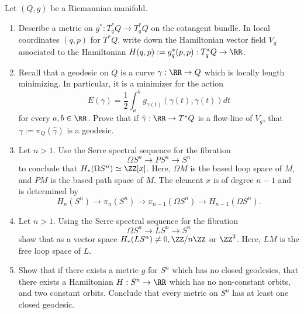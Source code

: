 
 
 \label{exr:geodesicsInSymplecticCohomology}
Let $(Q, g)$ be a Riemannian manifold. 
\begin{enumerate}
    \item Describe a metric on $ g^*:T^*_qQ\to T^*_qQ$ on the cotangent bundle. In local coordinates $(q, p)$ for $T^*Q$,  write down the Hamiltonian vector field $V_g$ associated to the Hamiltonian $H(q, p):=g_q^*(p, p): T^*_qQ\to \RR$.
    \item Recall that a geodesic on $Q$ is a curve $\gamma:\RR\to Q$ which is locally length minimizing. In particular, it is a minimizer for the action 
    \[E(\gamma)=\frac{1}{2}\int_a^b g_{\gamma(t)}(\dot \gamma(t), \dot \gamma(t)) dt\]
    for every $a,b\in \RR$. Prove that if $\hat \gamma: \RR\to T^*Q$ is a flow-line of $V_g$, that $\gamma:=\pi_Q(\hat \gamma)$ is a geodesic.
    \item Let $n>1$. Use the Serre spectral sequence for the fibration
    \[\Omega S^n\to PS^n\to S^n\]
    to conclude that $H_*(\Omega S^n)\simeq \ZZ[x]$. Here, $\Omega M$ is the based loop space of $M$, and $PM$ is the based path space of $M$. The element $x$ is of degree $n-1$ and is determined by 
    \[H_n(S^n)\to \pi_n(S^n)\to \pi_{n-1}(\Omega S^n)\to H_{n-1}(\Omega S^n).\]
    \item Let $n>1$. Using the Serre spectral sequence for the fibration 
    \[\Omega S^n\to LS^n\to S^n\]
    show that as a vector space $H_*(LS^n)\neq 0, \ZZ/n\ZZ$ or $\ZZ^2$. Here, $LM$ is the free loop space of $L$.
    \item Show that if there exists a metric $g$ for $S^n$ which has no closed geodesics, that there exists a Hamiltonian $H: S^n\to \RR$ which has no non-constant orbits, and two constant orbits. Conclude that every metric on $S^n$ has at least one closed geodesic.
\end{enumerate}

 